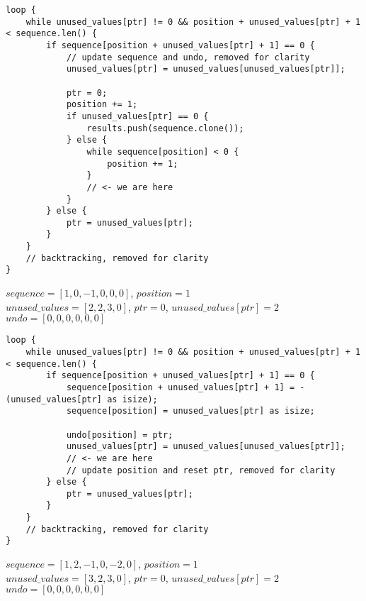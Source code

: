 \begin{frame}[fragile]
    \begin{verbatim}
loop {
    while unused_values[ptr] != 0 && position + unused_values[ptr] + 1 < sequence.len() {
        if sequence[position + unused_values[ptr] + 1] == 0 {
            // update sequence and undo, removed for clarity
            unused_values[ptr] = unused_values[unused_values[ptr]];
            
            ptr = 0;
            position += 1;
            if unused_values[ptr] == 0 {
                results.push(sequence.clone());
            } else {
                while sequence[position] < 0 {
                    position += 1;
                }
                // <- we are here
            }
        } else {
            ptr = unused_values[ptr];
        }
    }
    // backtracking, removed for clarity
}
    \end{verbatim}
    $sequence = [1, 0, -1, 0, 0, 0]$, $position = 1$\\
    $unused\_values = [2, 2, 3, 0]$, $ptr = 0$, $unused\_values[ptr] = 2$\\
    $undo = [0, 0, 0, 0, 0, 0]$
\end{frame}
\begin{frame}[fragile]
    \begin{verbatim}
loop {
    while unused_values[ptr] != 0 && position + unused_values[ptr] + 1 < sequence.len() {
        if sequence[position + unused_values[ptr] + 1] == 0 {
            sequence[position + unused_values[ptr] + 1] = -(unused_values[ptr] as isize);
            sequence[position] = unused_values[ptr] as isize;

            undo[position] = ptr;
            unused_values[ptr] = unused_values[unused_values[ptr]];
            // <- we are here
            // update position and reset ptr, removed for clarity
        } else {
            ptr = unused_values[ptr];
        }
    }
    // backtracking, removed for clarity
}
    \end{verbatim}
    $sequence = [1, 2, -1, 0, -2, 0]$, $position = 1$\\
    $unused\_values = [3, 2, 3, 0]$, $ptr = 0$, $unused\_values[ptr] = 2$\\
    $undo = [0, 0, 0, 0, 0, 0]$
\end{frame}
